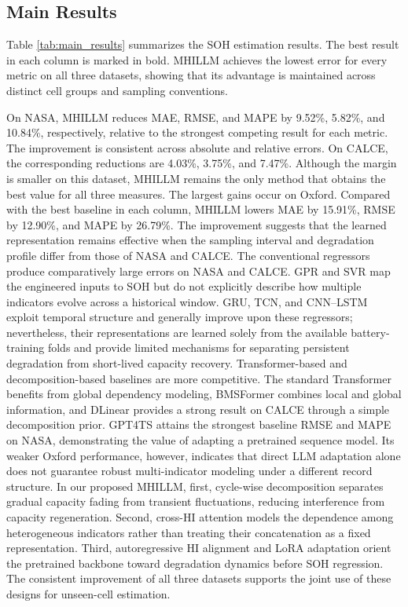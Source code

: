 \documentclass[preprint,12pt]{elsarticle}
\begin{document}
\subsection{Main Results}
Table \ref{tab:main_results} summarizes the SOH estimation results. The best result in each column is marked in bold. MHILLM achieves the lowest error for every metric on all three datasets, showing that its advantage is maintained across distinct cell groups and sampling conventions.

On NASA, MHILLM reduces MAE, RMSE, and MAPE by 9.52\%, 5.82\%, and 10.84\%, respectively, relative to the strongest competing result for each metric. The improvement is consistent across absolute and relative errors. On CALCE, the corresponding reductions are 4.03\%, 3.75\%, and 7.47\%. Although the margin is smaller on this dataset, MHILLM remains the only method that obtains the best value for all three measures. The largest gains occur on Oxford. Compared with the best baseline in each column, MHILLM lowers MAE by 15.91\%, RMSE by 12.90\%, and MAPE by 26.79\%. The improvement suggests that the learned representation remains effective when the sampling interval and degradation profile differ from those of NASA and CALCE. The conventional regressors produce comparatively large errors on NASA and CALCE. GPR and SVR map the engineered inputs to SOH but do not explicitly describe how multiple indicators evolve across a historical window. GRU, TCN, and CNN--LSTM exploit temporal structure and generally improve upon these regressors; nevertheless, their representations are learned solely from the available battery-training folds and provide limited mechanisms for separating persistent degradation from short-lived capacity recovery.
Transformer-based and decomposition-based baselines are more competitive. The standard Transformer benefits from global dependency modeling, BMSFormer combines local and global information, and DLinear provides a strong result on CALCE through a simple decomposition prior. GPT4TS attains the strongest baseline RMSE and MAPE on NASA, demonstrating the value of adapting a pretrained sequence model. Its weaker Oxford performance, however, indicates that direct LLM adaptation alone does not guarantee robust multi-indicator modeling under a different record structure. In our proposed MHILLM, first, cycle-wise decomposition separates gradual capacity fading from transient fluctuations, reducing interference from capacity regeneration. Second, cross-HI attention models the dependence among heterogeneous indicators rather than treating their concatenation as a fixed representation. Third, autoregressive HI alignment and LoRA adaptation orient the pretrained backbone toward degradation dynamics before SOH regression. The consistent improvement of all three datasets supports the joint use of these designs for unseen-cell estimation.
\end{document}
